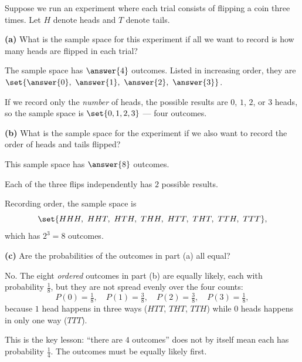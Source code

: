 \documentclass[12pt]{ximera}
\begin{document}
\begin{problem}
Suppose we run an experiment where each trial consists of flipping a coin three
times. Let $H$ denote heads and $T$ denote tails.

\begin{prompt}
\textbf{(a)} What is the sample space for this experiment if all we want to record
is how many heads are flipped in each trial?

The sample space has $\answer{4}$ outcomes. Listed in increasing order, they are
$\set{\answer{0},\ \answer{1},\ \answer{2},\ \answer{3}}$.

\begin{feedback}
If we record only the \emph{number} of heads, the possible results are
$0$, $1$, $2$, or $3$ heads, so the sample space is $\set{0,1,2,3}$ --- four
outcomes.
\end{feedback}
\end{prompt}

\begin{prompt}
\textbf{(b)} What is the sample space for the experiment if we also want to record
the order of heads and tails flipped?

This sample space has $\answer{8}$ outcomes.

\begin{hint}
Each of the three flips independently has $2$ possible results.
\end{hint}

\begin{feedback}
Recording order, the sample space is
\[
\set{HHH,\ HHT,\ HTH,\ THH,\ HTT,\ THT,\ TTH,\ TTT},
\]
which has $2^3=8$ outcomes.
\end{feedback}
\end{prompt}

\begin{prompt}
\textbf{(c)} Are the probabilities of the outcomes in part (a) all equal?

\begin{multipleChoice}
\end{multipleChoice}

\begin{feedback}
No. The eight \emph{ordered} outcomes in part (b) are equally likely, each with
probability $\frac18$, but they are not spread evenly over the four counts:
\[
P(0)=\tfrac18,\quad P(1)=\tfrac38,\quad P(2)=\tfrac38,\quad P(3)=\tfrac18,
\]
because $1$ head happens in three ways ($HTT$, $THT$, $TTH$) while $0$ heads happens
in only one way ($TTT$).

This is the key lesson: ``there are $4$ outcomes'' does not by itself mean each has
probability $\frac14$. The outcomes must be equally likely first.
\end{feedback}
\end{prompt}
\end{problem}
\end{document}
